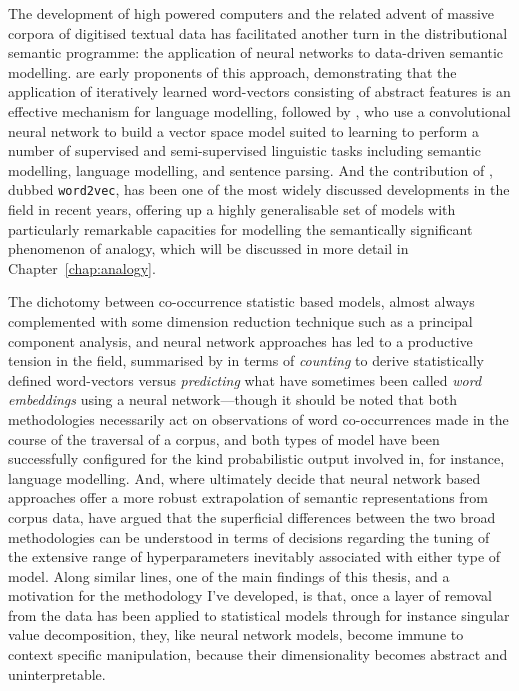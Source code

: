 The development of high powered computers and the related advent of massive corpora of digitised textual data has facilitated another turn in the distributional semantic programme: the application of neural networks to data-driven semantic modelling.  \cite{BengioEA2003} are early proponents of this approach, demonstrating that the application of iteratively learned word-vectors consisting of abstract features is an effective mechanism for language modelling, followed by \cite{CollobertEA2008}, who use a convolutional neural network to build a vector space model suited to learning to perform a number of supervised and semi-supervised linguistic tasks including semantic modelling, language modelling, and sentence parsing.  And the contribution of \cite{MikolovEA2013}, dubbed \texttt{word2vec}, has been one of the most widely discussed developments in the field in recent years, offering up a highly generalisable set of models with particularly remarkable capacities for modelling the semantically significant phenomenon of analogy, which will be discussed in more detail in Chapter~\ref{chap:analogy}.

The dichotomy between co-occurrence statistic based models, almost always complemented with some dimension reduction technique such as a principal component analysis, and neural network approaches has led to a productive tension in the field, summarised by \cite{BaroniEA2014} in terms of \emph{counting} to derive statistically defined word-vectors versus \emph{predicting} what have sometimes been called \emph{word embeddings} using a neural network---though it should be noted that both methodologies necessarily act on observations of word co-occurrences made in the course of the traversal of a corpus, and both types of model have been successfully configured for the kind probabilistic output involved in, for instance, language modelling.  And, where \citeauthor{BaroniEA2014} ultimately decide that neural network based approaches offer a more robust extrapolation of semantic representations from corpus data, \cite{LevyEA2014b} have argued that the superficial differences between the two broad methodologies can be understood in terms of decisions regarding the tuning of the extensive range of hyperparameters inevitably associated with either type of model.  Along similar lines, one of the main findings of this thesis, and a motivation for the methodology I've developed, is that, once a layer of removal from the data has been applied to statistical models through for instance singular value decomposition, they, like neural network models, become immune to context specific manipulation, because their dimensionality becomes abstract and uninterpretable.

